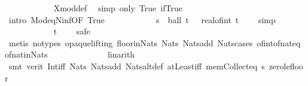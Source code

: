 \begin{isabellebody}
\ \ \ \ \ \ \ \ \ \ \isamarkupfalse%
\ X{\isacharunderscore}{\kern0pt}mod{\isacharunderscore}{\kern0pt}def\ \isamarkupfalse%
\ {\isacharparenleft}{\kern0pt}simp\ only{\isacharcolon}{\kern0pt}\ True\ if{\isacharunderscore}{\kern0pt}True{\isacharparenright}{\kern0pt}\isanewline
\ \ \ \ \ \ \ \ \ \ \isamarkupfalse%
\ {\isacharparenleft}{\kern0pt}intro\ Mod{\isacharunderscore}{\kern0pt}eq{\isacharunderscore}{\kern0pt}N{\isacharunderscore}{\kern0pt}inf{\isacharbrackleft}{\kern0pt}OF\ True{\isacharbrackright}{\kern0pt}{\isacharparenright}{\kern0pt}\isanewline
\ \ \ \ \ \ \ \ \ \ \isamarkupfalse%
\ {\isacartoucheopen}s\ {\isasymin}\ ball\ t\ {\isasymepsilon}\ {\isasyminter}\ {\isacharbraceleft}{\kern0pt}{}{\isachardot}{\kern0pt}{\isachardot}{\kern0pt}real{\isacharunderscore}{\kern0pt}of{\isacharunderscore}{\kern0pt}int\ {\isasymlfloor}t{\isasymrfloor}\ {\isacharplus}{\kern0pt}\ {}{\isacharbraceright}{\kern0pt}{\isacartoucheclose}\ \isamarkupfalse%
\ simp\isanewline
\ \ \ \ \ \ \ \ \ \ \isamarkupfalse%
\ {\isacartoucheopen}t\ {\isasymin}\ {\isacharbraceleft}{\kern0pt}{}{\isachardot}{\kern0pt}{\isachardot}{\kern0pt}{\isacharbraceright}{\kern0pt}{\isacartoucheclose}\ \isamarkupfalse%
\ safe\isanewline
\ \ \ \ \ \ \ \ \ \ \isamarkupfalse%
\ {\isacharparenleft}{\kern0pt}metis\ {\isacharparenleft}{\kern0pt}no{\isacharunderscore}{\kern0pt}types{\isacharcomma}{\kern0pt}\ opaque{\isacharunderscore}{\kern0pt}lifting{\isacharparenright}{\kern0pt}\ floor{\isacharunderscore}{\kern0pt}in{\isacharunderscore}{\kern0pt}Nats\ Nats{\isacharunderscore}{\kern0pt}{}\ Nats{\isacharunderscore}{\kern0pt}add\ Nats{\isacharunderscore}{\kern0pt}cases\ of{\isacharunderscore}{\kern0pt}int{\isacharunderscore}{\kern0pt}of{\isacharunderscore}{\kern0pt}nat{\isacharunderscore}{\kern0pt}eq\ of{\isacharunderscore}{\kern0pt}nat{\isacharunderscore}{\kern0pt}in{\isacharunderscore}{\kern0pt}Nats{\isacharparenright}{\kern0pt}\isanewline
\ \ \ \ \ \ \ \ \ \ \ \ \isamarkupfalse%
\ linarith\isanewline
\ \ \ \ \ \ \ \ \ \ \ \isamarkupfalse%
\ {\isacharparenleft}{\kern0pt}smt\ {\isacharparenleft}{\kern0pt}verit{\isacharparenright}{\kern0pt}\ Int{\isacharunderscore}{\kern0pt}iff\ Nats{\isacharunderscore}{\kern0pt}{}\ Nats{\isacharunderscore}{\kern0pt}add\ Nats{\isacharunderscore}{\kern0pt}altdef{}\ atLeast{\isacharunderscore}{\kern0pt}iff\ mem{\isacharunderscore}{\kern0pt}Collect{\isacharunderscore}{\kern0pt}eq\ s\ zero{\isacharunderscore}{\kern0pt}le{\isacharunderscore}{\kern0pt}floor{\isacharparenright}{\kern0pt}\isanewline

\end{isabellebody}
